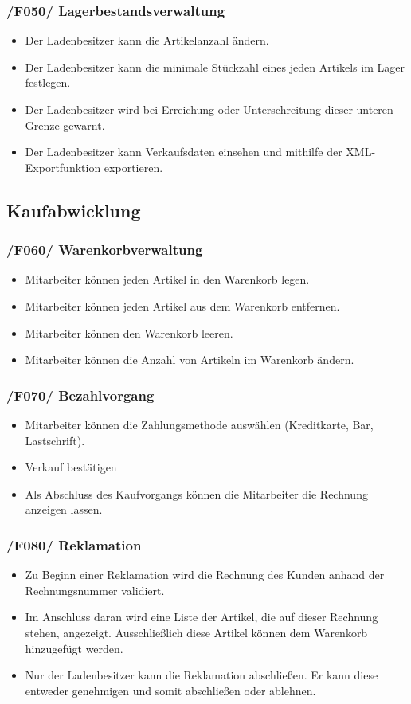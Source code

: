 \documentclass[pdftex,12pt,a4paper]{article}
\begin{document}
\subsubsection*{/F050/ Lagerbestandsverwaltung}
\begin{itemize}
\item Der Ladenbesitzer kann die Artikelanzahl \"andern.
\item Der Ladenbesitzer kann die minimale Stückzahl eines jeden Artikels im Lager festlegen.
\item Der Ladenbesitzer wird bei Erreichung oder Unterschreitung dieser unteren Grenze gewarnt.
\item Der Ladenbesitzer kann Verkaufsdaten einsehen und mithilfe der XML-Exportfunktion exportieren.
\end{itemize}
\subsection*{Kaufabwicklung}
\subsubsection*{/F060/ Warenkorbverwaltung}
\begin{itemize}
\item Mitarbeiter k\"onnen jeden Artikel in den Warenkorb legen.
\item Mitarbeiter k\"onnen jeden Artikel aus dem Warenkorb entfernen.
\item Mitarbeiter k\"onnen den Warenkorb leeren.
\item Mitarbeiter k\"onnen die Anzahl von Artikeln im Warenkorb \"andern.
\end{itemize}
\subsubsection*{/F070/ Bezahlvorgang}
\begin{itemize}
\item Mitarbeiter können die Zahlungsmethode ausw\"ahlen (Kreditkarte, Bar, Lastschrift).
\item Verkauf best\"atigen
\item Als Abschluss des Kaufvorgangs können die Mitarbeiter die Rechnung anzeigen lassen.
\end{itemize}
\subsubsection*{/F080/ Reklamation}
\begin{itemize}
\item Zu Beginn einer Reklamation wird die Rechnung des Kunden anhand der Rechnungsnummer validiert.
\item Im Anschluss daran wird eine Liste der Artikel, die auf dieser Rechnung stehen, angezeigt. Ausschlie\ss{}lich diese Artikel können dem Warenkorb hinzugefügt werden.
\item Nur der Ladenbesitzer kann die Reklamation abschlie\ss{}en. Er kann diese entweder genehmigen und somit abschlie\ss{}en oder ablehnen.
\end{itemize}
\end{document}
